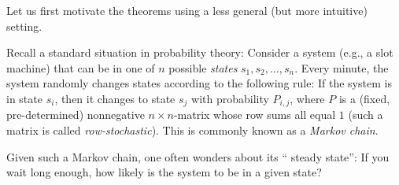 \documentclass[numbers=enddot,12pt,final,onecolumn,notitlepage]{scrartcl}%
\numberwithin{exer}{subsection}
\theoremstyle{definition}
\begin{document}
Let us first motivate the theorems using a less general (but more intuitive) setting.

Recall a standard situation in probability theory: Consider a system (e.g., a
slot machine) that can be in one of $n$ possible \emph{states} $s_{1}%
,s_{2},\ldots,s_{n}$. Every minute, the system randomly changes states
according to the following rule: If the system is in state $s_{i}$, then it
changes to state $s_{j}$ with probability $P_{i,j}$, where $P$ is a (fixed,
pre-determined) nonnegative $n\times n$-matrix whose row sums all equal $1$
(such a matrix is called \emph{row-stochastic}). This is commonly known as a
\emph{Markov chain}.

Given such a Markov chain, one often wonders about its \textquotedblleft
steady state\textquotedblright: If you wait long enough, how likely is the
system to be in a given state?
\end{document}
